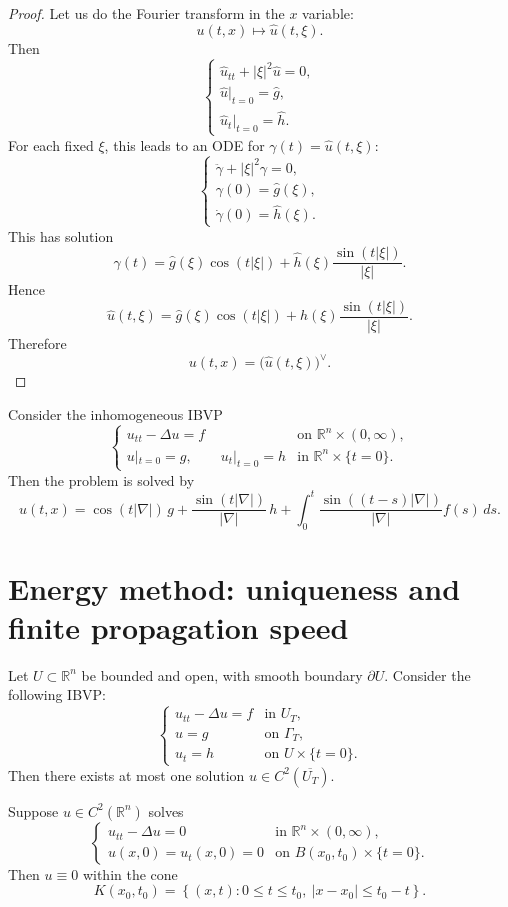 \begin{proof}
Let us do the Fourier transform in the $x$ variable:
$$
u(t,x)\mapsto \widehat{u}(t,\xi).
$$
Then
$$
\begin{cases}
\widehat{u}_{tt}+|\xi|^2\widehat{u}=0,\\
\widehat{u}|_{t=0}=\widehat{g},\\
\widehat{u}_t|_{t=0}=\widehat{h}.
\end{cases}
$$
For each fixed $\xi$, this leads to an ODE for
$
\gamma(t)=\widehat{u}(t,\xi):
$
$$
\begin{cases}
\ddot{\gamma}+|\xi|^2\gamma=0,\\
\gamma(0)=\widehat{g}(\xi),\\ 
\dot{\gamma}(0)=\widehat{h}(\xi).
\end{cases}
$$
This has solution
$$
\gamma(t)
=
\widehat{g}(\xi)\cos(t|\xi|)
+
\widehat{h}(\xi)\frac{\sin(t|\xi|)}{|\xi|}.
$$
Hence
$$
\widehat{u}(t,\xi)
=
\widehat{g}(\xi)\cos(t|\xi|)
+
\widehat{h}(\xi)\frac{\sin(t|\xi|)}{|\xi|}.
$$
Therefore
$$
u(t,x)=\bigl(\widehat{u}(t,\xi)\bigr)^\vee.
$$
\end{proof}

\begin{theorem}
Consider the inhomogeneous IBVP
$$
\begin{cases}
u_{tt}-\Delta u=f & \text{on } \mathbb{R}^n\times (0,\infty),\\
u|_{t=0}=g,\qquad u_t|_{t=0}=h
& \text{in } \mathbb{R}^n\times \{t=0\}.
\end{cases}
$$
Then the problem is solved by
$$
u(t,x)
=
\cos(t|\nabla|)\,g
+
\frac{\sin(t|\nabla|)}{|\nabla|}\,h
+
\int_0^t
\frac{\sin((t-s)|\nabla|)}{|\nabla|}f(s)\,ds.
$$
\end{theorem}

\section{Energy method: uniqueness and finite propagation speed}

\begin{theorem}
Let $U\subset \mathbb{R}^n$ be bounded and open, with smooth boundary $\partial U$.
Consider the following IBVP:
$$
\begin{cases}
u_{tt}-\Delta u=f & \text{in } U_T,\\
u=g & \text{on } \Gamma_T,\\
u_t=h & \text{on } U\times \{t=0\}.
\end{cases}
$$
Then there exists at most one solution
$
u\in C^2(\overline{U_T}).
$
\end{theorem}

\begin{theorem}
Suppose
$
u\in C^2(\mathbb{R}^n)
$
solves
$$
\begin{cases}
u_{tt}-\Delta u=0 & \text{in } \mathbb{R}^n\times (0,\infty),\\
u(x,0)=u_t(x,0)=0 & \text{on } B(x_0,t_0)\times \{t=0\}.
\end{cases}
$$
Then
$
u\equiv 0
$
within the cone
$$
K(x_0,t_0)
=
\left\{
(x,t): 0\le t\le t_0,\ |x-x_0|\le t_0-t
\right\}.
$$
\end{theorem}